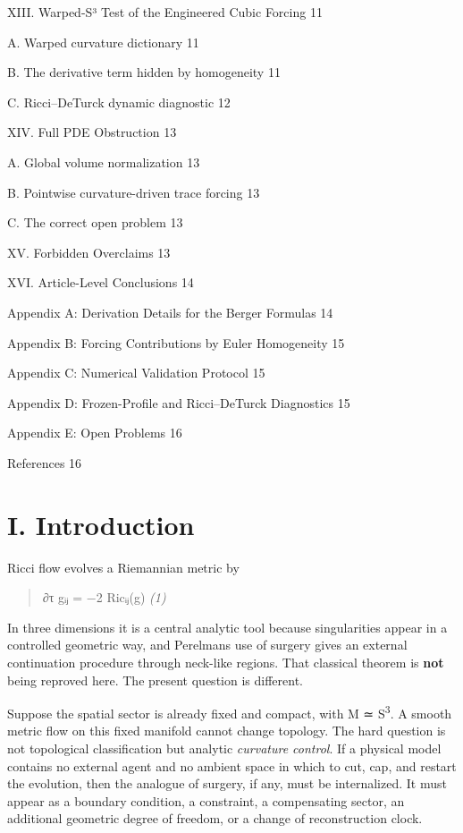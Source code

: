 \documentclass[
]{article}
\begin{document}
XIII. Warped-S³ Test of the Engineered Cubic Forcing 11

A. Warped curvature dictionary 11

B. The derivative term hidden by homogeneity 11

C. Ricci--DeTurck dynamic diagnostic 12

XIV. Full PDE Obstruction 13

A. Global volume normalization 13

B. Pointwise curvature-driven trace forcing 13

C. The correct open problem 13

XV. Forbidden Overclaims 13

XVI. Article-Level Conclusions 14

Appendix A: Derivation Details for the Berger Formulas 14

Appendix B: Forcing Contributions by Euler Homogeneity 15

Appendix C: Numerical Validation Protocol 15

Appendix D: Frozen-Profile and Ricci--DeTurck Diagnostics 15

Appendix E: Open Problems 16

References 16

\section{I. Introduction}\label{i.-introduction}

Ricci flow evolves a Riemannian metric by

\begin{quote}
∂τ gᵢⱼ = −2 Ricᵢⱼ(g) \emph{(1)}
\end{quote}

In three dimensions it is a central analytic tool because singularities appear in a controlled geometric way, and Perelman\textquotesingle s use of surgery gives an external continuation procedure through neck-like regions. That classical theorem is \textbf{not} being reproved here. The present question is different.

Suppose the spatial sector is already fixed and compact, with M ≃ S\textsuperscript{3}. A smooth metric flow on this fixed manifold cannot change topology. The hard question is not topological classification but analytic \emph{curvature control}. If a physical model contains no external agent and no ambient space in which to cut, cap, and restart the evolution, then the analogue of surgery, if any, must be internalized. It must appear as a boundary condition, a constraint, a compensating sector, an additional geometric degree of freedom, or a change of reconstruction clock.
\end{document}
